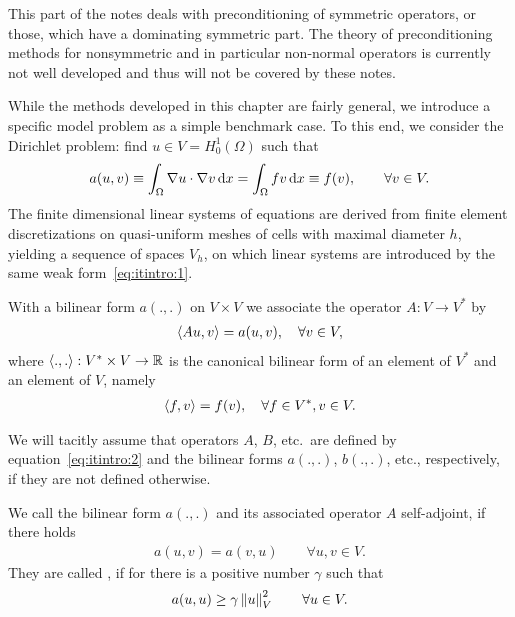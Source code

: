 
\begin{remark}
  This part of the notes deals with preconditioning of symmetric
  operators, or those, which have a dominating symmetric part. The
  theory of preconditioning methods for nonsymmetric and in particular
  non-normal operators is currently not well developed and thus will not
  be covered by these notes. 
\end{remark}

\begin{example}
  While the methods developed in this chapter are fairly general, we
  introduce a specific model problem as a simple benchmark case. To
  this end, we consider the Dirichlet problem: find $u\in V =
  H^1_0(\Omega)$ such that
  \begin{gather}
    \label{eq:itintro:1}
    a(u,v) \equiv \int_\Omega \nabla u\cdot \nabla v \,\mathrm{d} x
    = \int_\Omega f v \,\mathrm{d} x \equiv f(v),
    \qquad \forall v\in V.
  \end{gather}
  The finite dimensional linear systems of equations are derived from
  finite element discretizations on quasi-uniform meshes of cells with
  maximal diameter $h$, yielding a sequence of spaces $V_h$, on which
  linear systems are introduced by the same weak
  form~\eqref{eq:itintro:1}.
\end{example}

\begin{notation}
  With a bilinear form $a(.,.)$ on $V\times V$ we associate the
  operator $A: V\to V^*$ by
  \begin{gather}
    \label{eq:itintro:2}
    \scal(Au,v) = a(u,v), \quad \forall v\in V,
  \end{gather}
  where $\scal(.,.):V^*\times V \to \R$ is the canonical bilinear form of an
  element of $V^*$ and an element of $V$, namely
  \begin{gather}
    \label{eq:richardson:9}
    \scal(f,v) = f(v), \quad \forall f\in V^*, v\in V.
  \end{gather}
  
  We will tacitly assume that operators $A$, $B$, etc.\ are defined by
  equation~\eqref{eq:itintro:2} and the bilinear forms $a(.,.)$,
  $b(.,.)$, etc., respectively, if they are not defined otherwise.
\end{notation}

\begin{definition}
  We call the bilinear form $a(.,.)$  and its
  associated operator $A$ self-adjoint, if there holds
  \begin{gather*}
    a(u,v) = a(v,u) \qquad \forall u,v \in V.
  \end{gather*}
  They are called , if for there is a positive number
  $\gamma$ such that
  \begin{gather*}
    a(u,u) \ge \gamma \left\|u\right\|_V^2 \qquad \forall u\in V.
  \end{gather*}
\end{definition}

